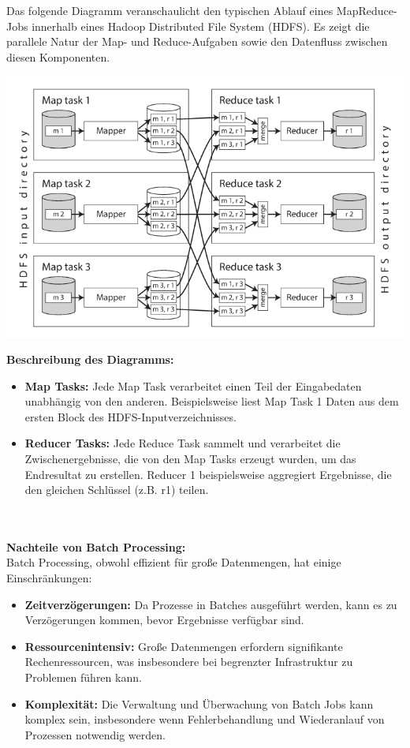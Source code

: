 \documentclass[9pt]{innovativeinnovation-cheatsheet}
\begin{document}
\begin{multicols*}{4}
  \\ \\
Das folgende Diagramm veranschaulicht den typischen Ablauf eines MapReduce-Jobs innerhalb eines Hadoop Distributed File System (HDFS). Es zeigt die parallele Natur der Map- und Reduce-Aufgaben sowie den Datenfluss zwischen diesen Komponenten.
\begin{center}
	\includegraphics[width=0.99\linewidth]{MapReduce}
\end{center}


\textbf{Beschreibung des Diagramms:}
\begin{itemize}
\item \textbf{Map Tasks:} Jede Map Task verarbeitet einen Teil der Eingabedaten unabhängig von den anderen. Beispielsweise liest Map Task 1 Daten aus dem ersten Block des HDFS-Inputverzeichnisses.
\item \textbf{Reducer Tasks:} Jede Reduce Task sammelt und verarbeitet die Zwischenergebnisse, die von den Map Tasks erzeugt wurden, um das Endresultat zu erstellen. Reducer 1 beispielsweise aggregiert Ergebnisse, die den gleichen Schlüssel (z.B. r1) teilen.
\end{itemize}


 \\ \\
\textbf{Nachteile von Batch Processing:} \\
Batch Processing, obwohl effizient für große Datenmengen, hat einige Einschränkungen:
\begin{itemize}
	\item \textbf{Zeitverzögerungen:} Da Prozesse in Batches ausgeführt werden, kann es zu Verzögerungen kommen, bevor Ergebnisse verfügbar sind.
	\item \textbf{Ressourcenintensiv:} Große Datenmengen erfordern signifikante Rechenressourcen, was insbesondere bei begrenzter Infrastruktur zu Problemen führen kann.
	\item \textbf{Komplexität:} Die Verwaltung und Überwachung von Batch Jobs kann komplex sein, insbesondere wenn Fehlerbehandlung und Wiederanlauf von Prozessen notwendig werden.
\end{itemize}


\end{multicols*}
\end{document}
